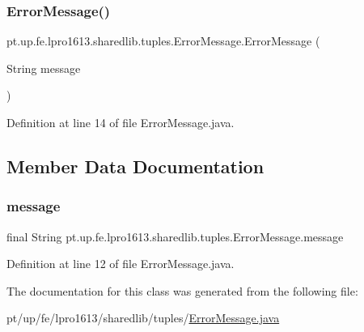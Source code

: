 \subsubsection{\texorpdfstring{Error\+Message()}{ErrorMessage()}}
{\footnotesize\ttfamily pt.\+up.\+fe.\+lpro1613.\+sharedlib.\+tuples.\+Error\+Message.\+Error\+Message (\begin{DoxyParamCaption}\item[{String}]{message }\end{DoxyParamCaption})}



Definition at line 14 of file Error\+Message.\+java.



\subsection{Member Data Documentation}
\hypertarget{classpt_1_1up_1_1fe_1_1lpro1613_1_1sharedlib_1_1tuples_1_1_error_message_a7de78ccd240f055c82da94670b9b9355}{}\label{classpt_1_1up_1_1fe_1_1lpro1613_1_1sharedlib_1_1tuples_1_1_error_message_a7de78ccd240f055c82da94670b9b9355} 
\subsubsection{\texorpdfstring{message}{message}}
{\footnotesize\ttfamily final String pt.\+up.\+fe.\+lpro1613.\+sharedlib.\+tuples.\+Error\+Message.\+message}



Definition at line 12 of file Error\+Message.\+java.



The documentation for this class was generated from the following file\+:\begin{DoxyCompactItemize}
\item 
pt/up/fe/lpro1613/sharedlib/tuples/\hyperlink{_error_message_8java}{Error\+Message.\+java}\end{DoxyCompactItemize}
